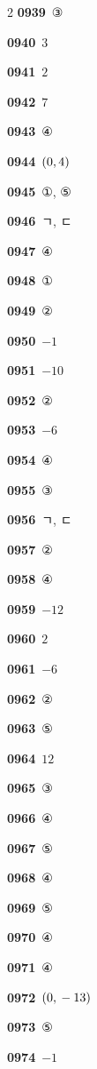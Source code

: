 \documentclass[10pt,a4paper]{article}
\begin{document}
\begin{multicols}{2}
\noindent\textbf{0939}\ ③\par
\noindent\textbf{0940}\ $3$\par
\noindent\textbf{0941}\ $2$\par
\noindent\textbf{0942}\ $7$\par
\noindent\textbf{0943}\ ④\par
\noindent\textbf{0944}\ $(0{,}\mkern3mu 4)$\par
\noindent\textbf{0945}\ ①, ⑤\par
\noindent\textbf{0946}\ ㄱ, ㄷ\par
\noindent\textbf{0947}\ ④\par
\noindent\textbf{0948}\ ①\par
\noindent\textbf{0949}\ ②\par
\noindent\textbf{0950}\ $-1$\par
\noindent\textbf{0951}\ $-10$\par
\noindent\textbf{0952}\ ②\par
\noindent\textbf{0953}\ $-6$\par
\noindent\textbf{0954}\ ④\par
\noindent\textbf{0955}\ ③\par
\noindent\textbf{0956}\ ㄱ, ㄷ\par
\noindent\textbf{0957}\ ②\par
\noindent\textbf{0958}\ ④\par
\noindent\textbf{0959}\ $-12$\par
\noindent\textbf{0960}\ $2$\par
\noindent\textbf{0961}\ $-6$\par
\noindent\textbf{0962}\ ②\par
\noindent\textbf{0963}\ ⑤\par
\noindent\textbf{0964}\ $12$\par
\noindent\textbf{0965}\ ③\par
\noindent\textbf{0966}\ ④\par
\noindent\textbf{0967}\ ⑤\par
\noindent\textbf{0968}\ ④\par
\noindent\textbf{0969}\ ⑤\par
\noindent\textbf{0970}\ ④\par
\noindent\textbf{0971}\ ④\par
\noindent\textbf{0972}\ $(0{,}\mkern3mu -13)$\par
\noindent\textbf{0973}\ ⑤\par
\noindent\textbf{0974}\ $-1$\par

\end{multicols}
\end{document}
